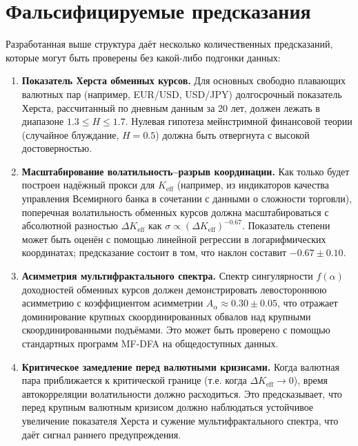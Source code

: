 \documentclass[12pt,a4paper]{article}
\theoremstyle{remark}
\begin{document}
	\section{Фальсифицируемые предсказания}
	
	Разработанная выше структура даёт несколько количественных предсказаний, которые могут быть проверены без какой-либо подгонки данных:
	
	\begin{enumerate}[label=(\arabic*)]
		\item \textbf{Показатель Херста обменных курсов.} Для основных свободно плавающих валютных пар (например, EUR/USD, USD/JPY) долгосрочный показатель Херста, рассчитанный по дневным данным за 20 лет, должен лежать в диапазоне \(1.3 \le H \le 1.7\). Нулевая гипотеза мейнстримной финансовой теории (случайное блуждание, \(H = 0.5\)) должна быть отвергнута с высокой достоверностью.
		
		\item \textbf{Масштабирование волатильность–разрыв координации.} Как только будет построен надёжный прокси для \(K_{\mathrm{eff}}\) (например, из индикаторов качества управления Всемирного банка в сочетании с данными о сложности торговли), поперечная волатильность обменных курсов должна масштабироваться с абсолютной разностью \(\Delta K_{\mathrm{eff}}\) как \(\sigma \propto (\Delta K_{\mathrm{eff}})^{-0.67}\). Показатель степени может быть оценён с помощью линейной регрессии в логарифмических координатах; предсказание состоит в том, что наклон составит \(-0.67 \pm 0.10\).
		
		\item \textbf{Асимметрия мультифрактального спектра.} Спектр сингулярности \(f(\alpha)\) доходностей обменных курсов должен демонстрировать левостороннюю асимметрию с коэффициентом асимметрии \(A_\alpha \approx 0.30 \pm 0.05\), что отражает доминирование крупных скоординированных обвалов над крупными скоординированными подъёмами. Это может быть проверено с помощью стандартных программ MF-DFA на общедоступных данных.
		
		\item \textbf{Критическое замедление перед валютными кризисами.} Когда валютная пара приближается к критической границе (т.е. когда \(\Delta K_{\mathrm{eff}} \to 0\)), время автокорреляции волатильности должно расходиться. Это предсказывает, что перед крупным валютным кризисом должно наблюдаться устойчивое увеличение показателя Херста и сужение мультифрактального спектра, что даёт сигнал раннего предупреждения.
	\end{enumerate}
	
\end{document}
